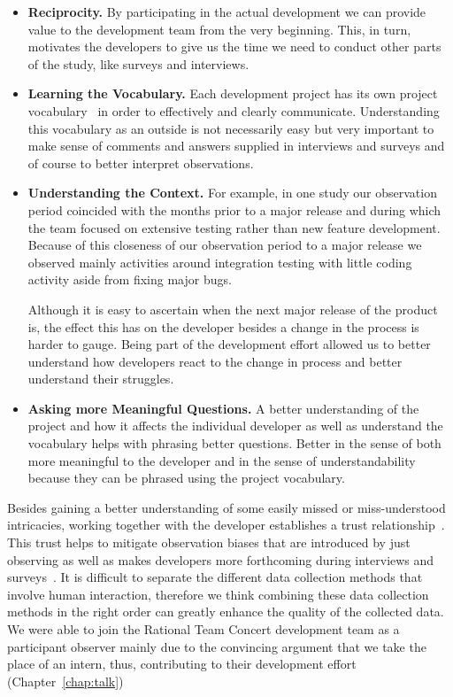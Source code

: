 \begin{itemize}
\item\textbf{Reciprocity.} By participating in the actual development we can provide value to the development team from the very beginning.
This, in turn, motivates the developers to give us the time we need to conduct other parts of the study, like surveys and interviews.
\item\textbf{Learning the Vocabulary.} Each development project has its own project vocabulary~\cite{espinosa2007:team_knowledge} in order to effectively and clearly communicate. 
Understanding this vocabulary as an outside is not necessarily easy but very important to make sense of comments and answers supplied in interviews and surveys and of course to better interpret observations.
\item\textbf{Understanding the Context.} For example, in one study our observation period coincided with the months prior to a major release and during which the team focused on extensive testing rather than new feature development. 
Because of this closeness of our observation period to a major release we observed mainly activities around integration testing with little coding activity aside from fixing major bugs.

Although it is easy to ascertain when the next major release of the product is, the effect this has on the developer besides a change in the process is harder to gauge.
Being part of the development effort allowed us to better understand how developers react to the change in process and better understand their struggles.

\item\textbf{Asking more Meaningful Questions.} A better understanding of the project and how it affects the individual developer as well as understand the vocabulary helps with phrasing better questions.
Better in the sense of both more meaningful to the developer and in the sense of understandability because they can be phrased using the project vocabulary.
\end{itemize}

Besides gaining a better understanding of some easily missed or miss-understood intricacies, working together with the developer establishes a trust relationship~\cite{letherbridge:ese2005}.
This trust helps to mitigate observation biases that are introduced by just observing as well as makes developers more forthcoming during interviews and surveys~\cite{letherbridge:ese2005}.
It is difficult to separate the different data collection methods that involve human interaction, therefore we think combining these data collection methods in the right order can greatly enhance the quality of the collected data.
We were able to join the Rational Team Concert development team as a participant observer mainly due to the convincing argument that we take the place of an intern, thus, contributing to their development effort (Chapter~\ref{chap:talk})

